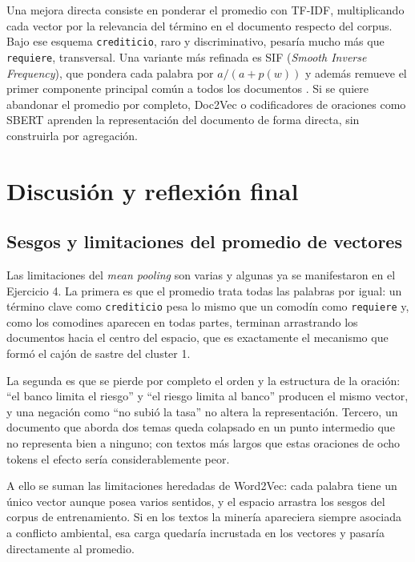\documentclass[12pt, a4paper]{article}
\newcommand{\code}[1]{\texttt{#1}}
\begin{document}
Una mejora directa consiste en ponderar el promedio con TF-IDF, multiplicando cada vector por la
relevancia del término en el documento respecto del corpus. Bajo ese esquema \code{crediticio}, raro
y discriminativo, pesaría mucho más que \code{requiere}, transversal. Una variante más refinada es
SIF (\textit{Smooth Inverse Frequency}), que pondera cada palabra por $a/(a + p(w))$ y además remueve
el primer componente principal común a todos los documentos \citep{arora2017simple}. Si se quiere
abandonar el promedio por completo, Doc2Vec \citep{le2014distributed} o codificadores de oraciones
como SBERT \citep{reimers2019sentence} aprenden la representación del documento de forma directa, sin
construirla por agregación.

\section{Discusión y reflexión final}

\subsection{Sesgos y limitaciones del promedio de vectores}

Las limitaciones del \textit{mean pooling} son varias y algunas ya se manifestaron en el Ejercicio 4.
La primera es que el promedio trata todas las palabras por igual: un término clave como
\code{crediticio} pesa lo mismo que un comodín como \code{requiere} y, como los comodines aparecen en
todas partes, terminan arrastrando los documentos hacia el centro del espacio, que es exactamente el
mecanismo que formó el cajón de sastre del cluster 1.

La segunda es que se pierde por completo el orden y la estructura de la oración: ``el banco limita el
riesgo'' y ``el riesgo limita al banco'' producen el mismo vector, y una negación como ``no subió la
tasa'' no altera la representación. Tercero, un documento que aborda dos temas queda colapsado en un
punto intermedio que no representa bien a ninguno; con textos más largos que estas oraciones de ocho
tokens el efecto sería considerablemente peor.

A ello se suman las limitaciones heredadas de Word2Vec: cada palabra tiene un único vector aunque
posea varios sentidos, y el espacio arrastra los sesgos del corpus de entrenamiento. Si en los textos
la minería apareciera siempre asociada a conflicto ambiental, esa carga quedaría incrustada en los
vectores y pasaría directamente al promedio.
\end{document}
